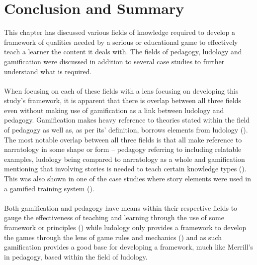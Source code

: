 \section{Conclusion and Summary}
This chapter has discussed various fields of knowledge required to develop a framework of qualities needed by a serious or educational game to effectively teach a learner the content it deals with. The fields of pedagogy, ludology and gamification were discussed in addition to several case studies to further understand what is required. 
\\\\
When focusing on each of these fields with a lens focusing on developing this study’s framework, it is apparent that there is overlap between all three fields even without making use of gamification as a link between ludology and pedagogy. Gamification makes heavy reference to theories stated within the field of pedagogy as well as, as per its’ definition, borrows elements from ludology (\cite{KappArticle2012}). The most notable overlap between all three fields is that all make reference to narratology in some shape or form – pedagogy referring to including relatable examples, ludology being compared to narratology as a whole and gamification mentioning that involving stories is needed to teach certain knowledge types (\cite{Dincelli2020, Frasca2013, Kapp2012a, Sheng2007}). This was also shown in one of the case studies where story elements were used in a gamified training system (\cite{Dincelli2020, Sheng2007}). 
\\\\
Both gamification and pedagogy have means within their respective fields to gauge the effectiveness of teaching and learning through the use of some framework or principles (\cite{Kapp2012a, Merrill2002, Reigeluth1996}) while ludology only provides a framework to develop the games through the lens of game rules and mechanics (\cite{DeGloria2014}) and as such gamification provides a good base for developing a framework, much like Merrill’s in pedagogy, based within the field of ludology.



